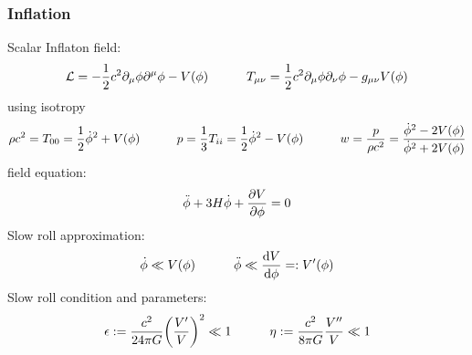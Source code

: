 		\subsubsection{Inflation}
			Scalar Inflaton field:
			\begin{equation}
				\mathcal{L} = -\frac{1}{2}c^2 \partial_\mu \phi \partial^\mu \phi - V(\phi)
				\hspace{30pt}
				T_{\mu\nu} = \frac{1}{2} c^2 \partial_\mu \phi \partial_\nu \phi - g_{\mu\nu} V(\phi)
			\end{equation}
			using isotropy
			\begin{equation}
				\rho c^2 = T_{00} = \frac{1}{2} \dot{\phi}^2 + V(\phi)
				\hspace{30pt}
				p = \frac{1}{3} T_{ii} = \frac{1}{2} \dot{\phi}^2 - V(\phi)
				\hspace{30pt}
				w = \frac{p}{\rho c^2} = \frac{\dot{\phi}^2 - 2V(\phi)}{\dot{\phi}^2 + 2V(\phi)}
			\end{equation}
			field equation:
			\begin{equation}
				\ddot{\phi} + 3 H \dot{\phi} + \pdv{V}{\phi} = 0
			\end{equation}
			Slow roll approximation:
			\begin{equation}
				\dot{\phi} \ll V(\phi)
				\hspace{30pt}
				\ddot{\phi} \ll \dv{V}{\phi} =: V'(\phi)
			\end{equation}
			Slow roll condition and parameters:
			\begin{equation}
				\epsilon := \frac{c^2}{24\pi G} \qty(\frac{V'}{V})^2 \ll 1
				\hspace{30pt}
				\eta := \frac{c^2}{8\pi G} \frac{V''}{V} \ll 1
			\end{equation}